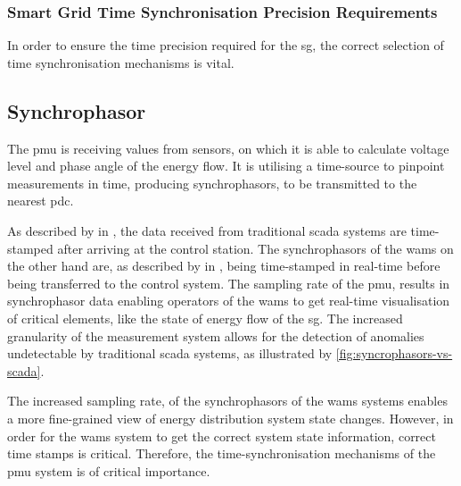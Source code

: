 \subsubsection[Smart Grid Time Sync Precision Requirements]{Smart Grid Time Synchronisation Precision Requirements}

In order to ensure the time precision required for the \acrshort{sg}, the correct selection of time synchronisation mechanisms is vital. 




\subsection{Synchrophasor}





The \acrshort{pmu} is receiving values from sensors, on which it is able to calculate voltage level and phase angle of the energy flow. It is utilising a time-source to pinpoint measurements in time, producing synchrophasors, to be transmitted to the nearest \acrshort{pdc}. 

As described by \citeauthor{dagle2019importance} in \cite{dagle2019importance}, the data received from traditional \acrshort{scada} systems are time-stamped after arriving at the control station. The synchrophasors of the \acrshort{wams} on the other hand are, as described by  in \cite{ali2016wide}, being time-stamped in real-time before being transferred to the control system. The sampling rate of the \acrshort{pmu}, results in synchrophasor data enabling operators of the \acrshort{wams} to get real-time visualisation of critical elements, like the state of energy flow  of the \acrlong{sg}. The increased granularity of the measurement system allows for the detection of anomalies undetectable by traditional \acrshort{scada} systems, as illustrated by \figureautorefname { }\ref{fig:syncrophasors-vs-scada}. 

The increased sampling rate, of the synchrophasors of the \acrshort{wams} systems enables a more fine-grained view of energy distribution system state changes. However, in order for the \acrshort{wams} system to get the correct system state information, correct time stamps is critical. 
Therefore, the time-synchronisation mechanisms of the \acrshort{pmu} system is of critical importance. \\ 

